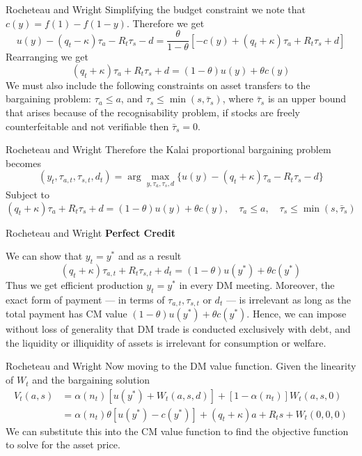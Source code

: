 \documentclass[aspectratio=169,xcolor=dvipsnames]{beamer}
\begin{document}
\begin{frame}{Rocheteau and Wright}
    Simplifying the budget constraint we note that $c(y) = f(1) - f(1-y)$. Therefore we get
    \[
        u(y) - (q_t - \kappa) \tau_a - R_t \tau_s - d = \frac{\theta}{1-\theta} [-c(y) + (q_t + \kappa) \tau_a + R_t \tau_s + d]
    \]
    Rearranging we get
    \[
        (q_t + \kappa) \tau_a + R_t \tau_s + d = (1-\theta) u(y) + \theta c(y)
    \]
    We must also include the following constraints on asset transfers to the bargaining problem: $\tau_a \le a$, and $\tau_s \le \min(s, \bar \tau_s)$, where $\bar \tau_s$ is an upper bound that arises because of the recognisability problem, if stocks are freely counterfeitable and not verifiable then $\bar \tau_s = 0$.
\end{frame}

\begin{frame}{Rocheteau and Wright}
    Therefore the Kalai proportional bargaining problem becomes
    \[
        (y_t, \tau_{a,t}, \tau_{s,t}, d_t) = \arg \max_{y, \tau_a, \tau_s, d} \{u(y) - (q_t + \kappa)\tau_a - R_t \tau_s - d\}
    \]
    Subject to
    \[
        (q_t + \kappa)\tau_a + R_t \tau_s + d = (1-\theta) u(y) + \theta c(y), \quad \tau_a \le a, \quad \tau_s \le \min(s, \bar \tau_s)
    \]
\end{frame}

\begin{frame}{Rocheteau and Wright}
    \textbf{Perfect Credit}

    We can show that $y_t = y^*$ and as a result
    \[
        (q_t + \kappa)\tau_{a,t} + R_t \tau_{s,t} + d_t = (1-\theta) u(y^*) + \theta c(y^*)
    \]
    Thus we get efficient production $y_t = y^*$ in every DM meeting. Moreover, the exact form of payment --- in terms of $\tau_{a,t}, \tau_{s,t}$ or $d_t$ --- is irrelevant as long as the total payment has CM value $(1-\theta)u(y^*) + \theta c(y^*)$. Hence, we can impose without loss of generality that DM trade is conducted exclusively with debt, and the liquidity or illiquidity of assets is irrelevant for consumption or welfare.
\end{frame}

\begin{frame}{Rocheteau and Wright}
    Now moving to the DM value function. Given the linearity of $W_t$ and the bargaining solution
    \begin{align*}
        V_t(a, s) &= \alpha(n_t)[u(y^*) + W_t(a, s, d)] + [1 - \alpha(n_t)] W_t(a, s, 0) \\
        &= \alpha(n_t) \theta [u(y^*) - c(y^*)] + (q_t + \kappa) a + R_t s + W_t(0, 0, 0)
    \end{align*}
    We can substitute this into the CM value function to find the objective function to solve for the asset price.
\end{frame}
\end{document}
